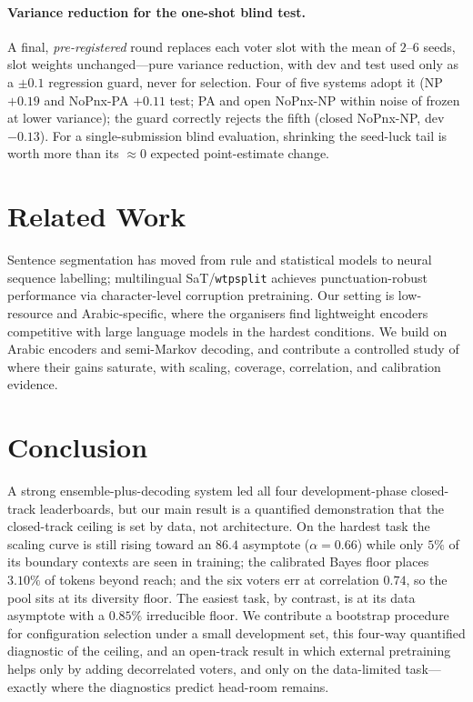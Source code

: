 \paragraph{Variance reduction for the one-shot blind test.} A final,
\emph{pre-registered} round replaces each voter slot with the mean of $2$--$6$
seeds, slot weights unchanged---pure variance reduction, with dev and test used
only as a $\pm0.1$ regression guard, never for selection. Four of five systems
adopt it (NP $+0.19$ and NoPnx-PA $+0.11$ test; PA and open NoPnx-NP within
noise of frozen at lower variance); the guard correctly rejects the fifth
(closed NoPnx-NP, dev $-0.13$). For a single-submission blind evaluation,
shrinking the seed-luck tail is worth more than its $\approx0$ expected
point-estimate change.

\section{Related Work}
Sentence segmentation has moved from rule and statistical models to neural sequence
labelling; multilingual SaT/\texttt{wtpsplit} \citep{frohmann2024sat} achieves
punctuation-robust performance via character-level corruption pretraining. Our setting
is low-resource and Arabic-specific, where the organisers find lightweight encoders
competitive with large language models in the hardest conditions. We build on Arabic
encoders \citep{antoun2020arabert,antoun2021araelectra,abdulmageed2021arbert,inoue2021camelbert}
and semi-Markov decoding, and contribute a controlled study of where their gains
saturate, with scaling, coverage, correlation, and calibration evidence.

\section{Conclusion}
A strong ensemble-plus-decoding system led all four development-phase closed-track
leaderboards, but our main result is a quantified demonstration that the closed-track
ceiling is set by data, not architecture. On the hardest task the scaling curve is
still rising toward an $86.4$ \fone{} asymptote ($\alpha{=}0.66$) while only $5\%$ of
its boundary contexts are seen in training; the calibrated Bayes floor places
$3.10\%$ of tokens beyond reach; and the six voters err at correlation $0.74$, so the
pool sits at its diversity floor. The easiest task, by contrast, is at its data
asymptote with a $0.85\%$ irreducible floor. We contribute a bootstrap procedure for
configuration selection under a small development set, this four-way quantified
diagnostic of the ceiling, and an open-track result in which external pretraining
helps only by adding decorrelated voters, and only on the data-limited task---exactly
where the diagnostics predict head-room remains.

